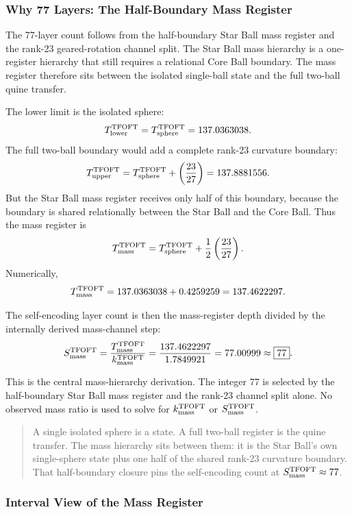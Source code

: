 \documentclass[11pt,a4paper]{article}
\begin{document}
\subsubsection{Why 77 Layers: The Half-Boundary Mass Register}
\label{sec:why_77_layers}

The 77-layer count follows from the half-boundary Star Ball mass register and the rank-23 geared-rotation channel split. The Star Ball mass hierarchy is a one-register hierarchy that still requires a relational Core Ball boundary. The mass register therefore sits between the isolated single-ball state and the full two-ball quine transfer.

The lower limit is the isolated sphere:
\[
T_{\rm lower}^{\rm TFOFT}
=
T_{\rm sphere}^{\rm TFOFT}
=
137.0363038.
\]
The full two-ball boundary would add a complete rank-23 curvature boundary:
\[
T_{\rm upper}^{\rm TFOFT}
=
T_{\rm sphere}^{\rm TFOFT}
+
\left(\frac{23}{27}\right)
=
137.8881556.
\]
But the Star Ball mass register receives only half of this boundary, because
the boundary is shared relationally between the Star Ball and the Core Ball.
Thus the mass register is
\[
T_{\rm mass}^{\rm TFOFT}
=
T_{\rm sphere}^{\rm TFOFT}
+
\frac12\left(\frac{23}{27}\right).
\]
Numerically,
\[
T_{\rm mass}^{\rm TFOFT}
=
137.0363038
+
0.4259259
=
137.4622297.
\]

The self-encoding layer count is then the mass-register depth divided by the
internally derived mass-channel step:
\[
S_{\rm mass}^{\rm TFOFT}
=
\frac{T_{\rm mass}^{\rm TFOFT}}{k_{\rm mass}^{\rm TFOFT}}
=
\frac{137.4622297}{1.7849921}
=
77.00999
\approx
\boxed{77}.
\]

This is the central mass-hierarchy derivation. The integer \(77\) is selected
by the half-boundary Star Ball mass register and the rank-23 channel split
alone. No observed mass ratio is used to solve for \(k_{\rm mass}^{\rm TFOFT}\)
or \(S_{\rm mass}^{\rm TFOFT}\).

\begin{quote}
A single isolated sphere is a state. A full two-ball register is the quine
transfer. The mass hierarchy sits between them: it is the Star Ball's own
single-sphere state plus one half of the shared rank-23 curvature boundary.
That half-boundary closure pins the self-encoding count at
\(S_{\rm mass}^{\rm TFOFT}\approx77\).
\end{quote}

\subsubsection{Interval View of the Mass Register}
\label{sec:mass_interval_view}
\end{document}

